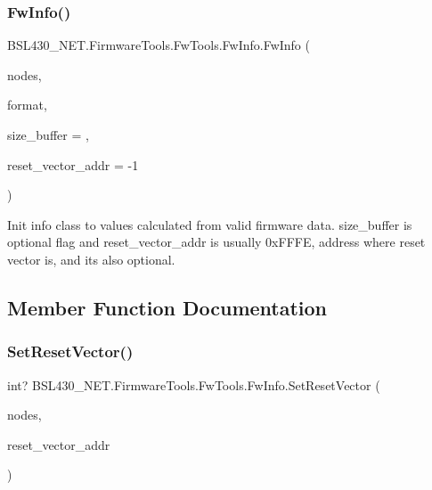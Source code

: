 \subsubsection{\texorpdfstring{FwInfo()}{FwInfo()}\hspace{0.1cm}{\footnotesize\ttfamily [3/3]}}
{\footnotesize\ttfamily B\+S\+L430\+\_\+\+N\+E\+T.\+Firmware\+Tools.\+Fw\+Tools.\+Fw\+Info.\+Fw\+Info (\begin{DoxyParamCaption}\item[{I\+Collection$<$ \mbox{\hyperlink{class_b_s_l430___n_e_t_1_1_firmware_tools_1_1_fw_tools_1_1_fw_node}{Fw\+Node}} $>$}]{nodes,  }\item[{Fw\+Format}]{format,  }\item[{int}]{size\+\_\+buffer = {},  }\item[{int}]{reset\+\_\+vector\+\_\+addr = {\ttfamily -\/1} }\end{DoxyParamCaption})}



Init info class to values calculated from valid firmware data. size\+\_\+buffer is optional flag and reset\+\_\+vector\+\_\+addr is usually 0x\+F\+F\+FE, address where reset vector is, and its also optional. 



\subsection{Member Function Documentation}
\mbox{\label{class_b_s_l430___n_e_t_1_1_firmware_tools_1_1_fw_tools_1_1_fw_info_a29c67167406735189b1f2d009dd0f3a8}} 
\subsubsection{\texorpdfstring{SetResetVector()}{SetResetVector()}}
{\footnotesize\ttfamily int? B\+S\+L430\+\_\+\+N\+E\+T.\+Firmware\+Tools.\+Fw\+Tools.\+Fw\+Info.\+Set\+Reset\+Vector (\begin{DoxyParamCaption}\item[{I\+Collection$<$ \mbox{\hyperlink{class_b_s_l430___n_e_t_1_1_firmware_tools_1_1_fw_tools_1_1_fw_node}{Fw\+Node}} $>$}]{nodes,  }\item[{int}]{reset\+\_\+vector\+\_\+addr }\end{DoxyParamCaption})}



